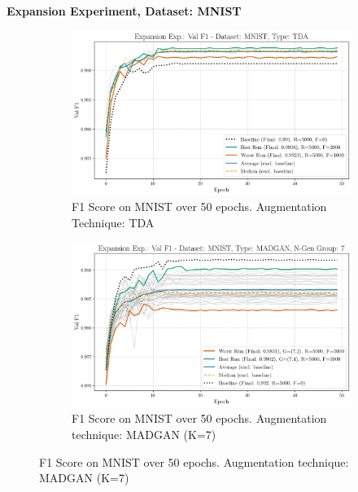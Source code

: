 \newpage
\noindent\textbf{Expansion Experiment, Dataset: MNIST}
\begin{figure}[H]
	\centering
	\begin{subfigure}{.85\textwidth}
		\includegraphics[width=\textwidth]{abb/strat_classifier_performance/tda_mnist/expansion_experiments/val_f1_score_tda_mnist_mnist_all.png}
		\caption{F1 Score on MNIST over 50 epochs. Augmentation Technique: TDA} 
        \label{fig:res_expansion_mnist_tda_vs_madgan__tda}
	\end{subfigure}
	\begin{subfigure}{.85\textwidth}
		\includegraphics[width=\textwidth]{abb/strat_classifier_performance/MNIST_STRATIFIED_CLASSIFIERS_MADGAN_NEW/expansion_experiments/val_f1_score_MADGAN_MNIST_n_gen_7_all.png}
		\caption{F1 Score on MNIST over 50 epochs. Augmentation technique: MADGAN (K=7)} 
        \label{fig:res_expansion_mnist_tda_vs_madgan__madgan}
	\end{subfigure}
\end{figure}

